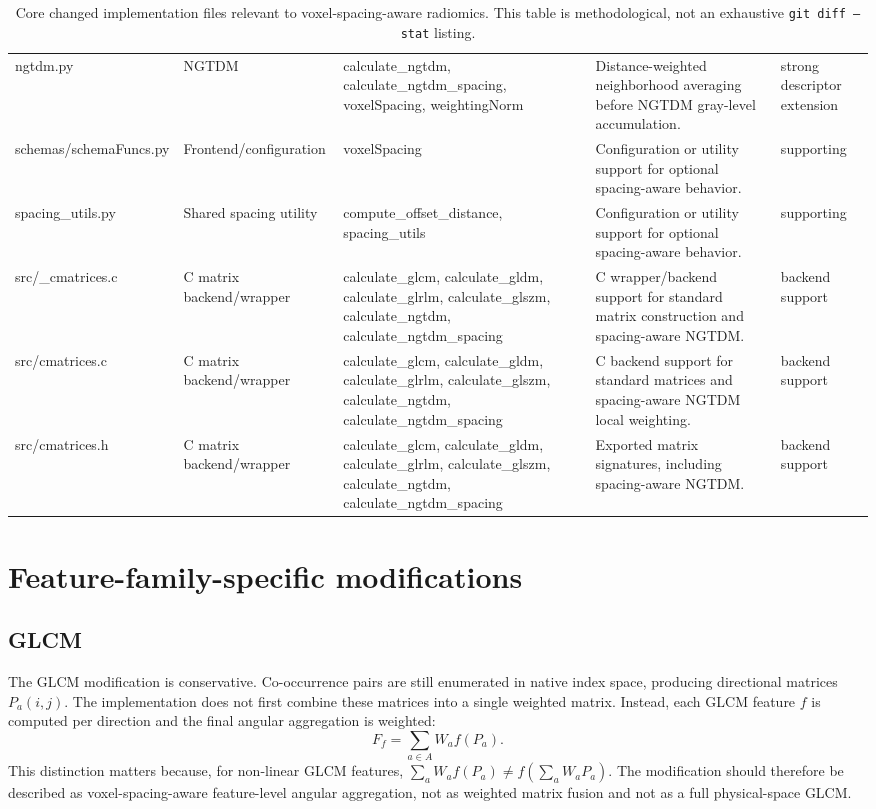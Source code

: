 \documentclass[11pt]{article}
\begin{document}
\begin{table}[t]
\begin{tabular}{p{}p{}p{}p{}p{}}
ngtdm.py & NGTDM & calculate\_ngtdm, calculate\_ngtdm\_spacing, voxelSpacing, weightingNorm & Distance-weighted neighborhood averaging before NGTDM gray-level accumulation. & strong descriptor extension \\
schemas/schemaFuncs.py & Frontend/configuration & voxelSpacing & Configuration or utility support for optional spacing-aware behavior. & supporting \\
spacing\_utils.py & Shared spacing utility & compute\_offset\_distance, spacing\_utils & Configuration or utility support for optional spacing-aware behavior. & supporting \\
src/\_cmatrices.c & C matrix backend/wrapper & calculate\_glcm, calculate\_gldm, calculate\_glrlm, calculate\_glszm, calculate\_ngtdm, calculate\_ngtdm\_spacing & C wrapper/backend support for standard matrix construction and spacing-aware NGTDM. & backend support \\
src/cmatrices.c & C matrix backend/wrapper & calculate\_glcm, calculate\_gldm, calculate\_glrlm, calculate\_glszm, calculate\_ngtdm, calculate\_ngtdm\_spacing & C backend support for standard matrices and spacing-aware NGTDM local weighting. & backend support \\
src/cmatrices.h & C matrix backend/wrapper & calculate\_glcm, calculate\_gldm, calculate\_glrlm, calculate\_glszm, calculate\_ngtdm, calculate\_ngtdm\_spacing & Exported matrix signatures, including spacing-aware NGTDM. & backend support \\
\bottomrule
\end{tabular}
\caption{Core changed implementation files relevant to voxel-spacing-aware radiomics. This table is methodological, not an exhaustive \texttt{git diff --stat} listing.}
\label{tab:modified-files}
\end{table}

\section{Feature-family-specific modifications}
\subsection{GLCM}
The GLCM modification is conservative. Co-occurrence pairs are still enumerated in native index space, producing directional matrices \(P_a(i,j)\). The implementation does not first combine these matrices into a single weighted matrix. Instead, each GLCM feature \(f\) is computed per direction and the final angular aggregation is weighted:
\begin{equation}
F_f = \sum_{a\in A} W_a f(P_a).
\end{equation}
This distinction matters because, for non-linear GLCM features, \(\sum_a W_a f(P_a)\neq f(\sum_a W_aP_a)\). The modification should therefore be described as voxel-spacing-aware feature-level angular aggregation, not as weighted matrix fusion and not as a full physical-space GLCM.
\end{document}

